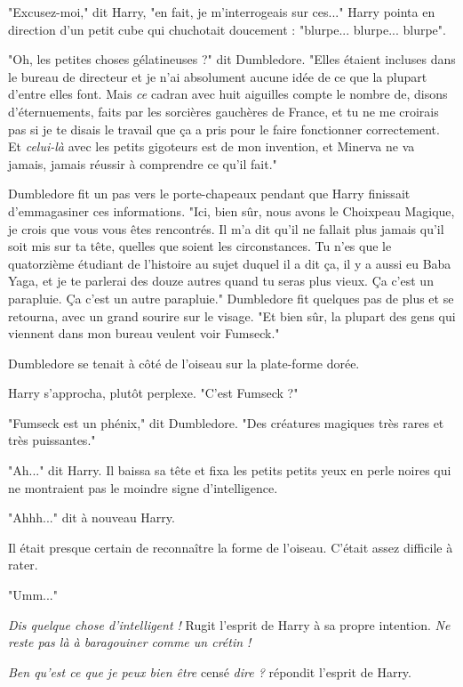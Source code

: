 "Excusez-moi," dit Harry, "en fait, je m'interrogeais sur ces..." Harry pointa en direction d'un petit cube qui chuchotait doucement : "blurpe... blurpe... blurpe".

"Oh, les petites choses gélatineuses ?" dit Dumbledore. "Elles étaient incluses dans le bureau de directeur et je n'ai absolument aucune idée de ce que la plupart d'entre elles font. Mais \emph{ce}  cadran avec huit aiguilles compte le nombre de, disons d'éternuements, faits par les sorcières gauchères de France, et tu ne me croirais pas si je te disais le travail que ça a pris pour le faire fonctionner correctement. Et \emph{celui-là}  avec les petits gigoteurs est de mon invention, et Minerva ne va jamais, jamais réussir à comprendre ce qu'il fait."

Dumbledore fit un pas vers le porte-chapeaux pendant que Harry finissait d'emmagasiner ces informations. "Ici, bien sûr, nous avons le Choixpeau Magique, je crois que vous vous êtes rencontrés. Il m'a dit qu'il ne fallait plus jamais qu'il soit mis sur ta tête, quelles que soient les circonstances. Tu n'es que le quatorzième étudiant de l'histoire au sujet duquel il a dit ça, il y a aussi eu Baba Yaga, et je te parlerai des douze autres quand tu seras plus vieux. Ça c'est un parapluie. Ça c'est un autre parapluie." Dumbledore fit quelques pas de plus et se retourna, avec un grand sourire sur le visage. "Et bien sûr, la plupart des gens qui viennent dans mon bureau veulent voir Fumseck."

Dumbledore se tenait à côté de l'oiseau sur la plate-forme dorée.

Harry s'approcha, plutôt perplexe. "C'est Fumseck ?"

"Fumseck est un phénix," dit Dumbledore. "Des créatures magiques très rares et très puissantes."

"Ah..." dit Harry. Il baissa sa tête et fixa les petits petits yeux en perle noires qui ne montraient pas le moindre signe d'intelligence.

"Ahhh..." dit à nouveau Harry.

Il était presque certain de reconnaître la forme de l'oiseau. C'était assez difficile à rater.

"Umm..."

\emph{Dis quelque chose d'intelligent ! } Rugit l'esprit de Harry à sa propre intention. \emph{Ne reste pas là à baragouiner comme un crétin !} 

\emph{Ben qu'est ce que je peux bien être } censé \emph{dire ? } répondit l'esprit de Harry.

